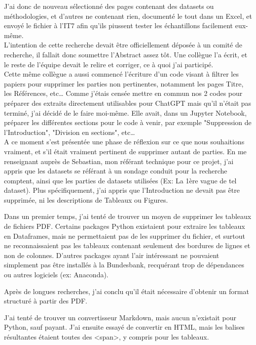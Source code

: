 J'ai donc de nouveau sélectionné des pages contenant des datasets ou méthodologies, et d'autres ne contenant rien, documenté le tout dans un Excel, et envoyé le fichier à l'IT7 afin qu'ils piussent tester les échantillons facilement eux-même.
\\

L'intention de cette recherche devait être officiellement déposée à un comité de recherche, il fallait donc soumettre l'Abstract assez tôt. 
Une collègue l'a écrit, et le reste de l'équipe devait le relire et corriger, ce à quoi j'ai participé.
\\

Cette même collègue a aussi commencé l'écriture d'un code visant à filtrer les papiers pour supprimer les parties non pertinentes, notamment les pages Titre, les Références, etc\dots
Comme j'étais censée mettre en commun nos 2 codes pour préparer des extraits directement utilisables pour ChatGPT mais qu'il n'était pas terminé, j'ai décidé de le faire moi-même.
Elle avait, dans un Jupyter Notebook, préparer les différentes sections pour le code à venir, par exemple "Suppression de l'Introduction", "Division en sections", etc\dots
\\

A ce moment s'est présentée une phase de réflexion sur ce que nous souhaitions vraiment, et s'il était vraiment pertinent de supprimer autant de parties.
En me renseignant auprès de Sebastian, mon référant technique pour ce projet, j'ai appris que les datasets se référant à un sondage conduit pour la recherche comptent, ainsi que les parties de datasets utilisées (Ex: La 1ère vague de tel dataset).
Plus spécifiquement, j'ai appris que l'Introduction ne devait pas être supprimée, ni les descriptions de Tableaux ou Figures.

Dans un premier temps, j'ai tenté de trouver un moyen de supprimer les tableaux de fichiers PDF.
Certains packages Python existaient pour extraire les tableaux en Dataframes, mais ne permettaient pas de les supprimer du fichier, et surtout ne reconnaissaient pas les tableaux contenant seulement des bordures de lignes et non de colonnes.
D'autres packages ayant l'air intéressant ne pouvaient simplement pas être installés à la Bundesbank, recquérant trop de dépendances ou autres logiciels (ex: Anaconda).

Après de longues recherches, j'ai conclu qu'il était nécessaire d'obtenir un format structuré à partir des PDF.

J'ai tenté de trouver un convertisseur Markdown, mais aucun n'existait pour Python, sauf payant.
J'ai ensuite essayé de convertir en HTML, mais les balises résultantes étaient toutes des <span>, y compris pour les tableaux.
\\

